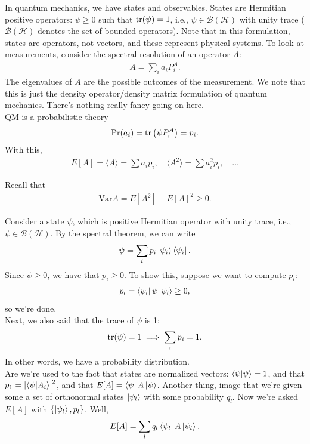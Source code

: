 \documentclass{book}
\theoremstyle{definition}
\newcommand{\had}{\mathcal{H}}
\newcommand{\lp}{\left(}
\newcommand{\rp}{\right)}
\begin{document}
In quantum mechanics, we have states and observables. States are Hermitian positive operators: $\psi \geq 0$ such that $\tr(\psi) = 1$, i.e., $\psi \in \mathcal{B}(\had)$ with unity trace ($\mathcal{B}(\had)$ denotes the set of bounded operators). Note that in this formulation, states are operators, not vectors, and these represent physical systems. To look at measurements, consider the spectral resolution of an operator $A$:
\begin{align}
A = \sum_i a_i P_i^A.
\end{align}
The eigenvalues of $A$ are the possible outcomes of the measurement. We note that this is just the density operator/density matrix formulation of quantum mechanics. There's nothing really fancy going on here.\\

QM is a probabilistic theory
\begin{align}
	\Pr(a_i) = \tr\lp \psi P_i^A \rp= p_i.
\end{align}
With this,
\begin{align}
E[A] = \langle A \rangle = \sum a_i p_i, \quad \langle A^2 \rangle = \sum a_i^2 p_i, \quad \dots
\end{align}

Recall that 
\begin{align}
\text{Var}{A} = E[A^2] - E[A]^2\geq 0.
\end{align}

Consider a state $\psi$, which is positive Hermitian operator with unity trace, i.e., $\psi \in \mathcal{B}(\had)$. By the spectral theorem, we can write
\begin{align}
{\psi} = \sum_i p_i \ket{\psi_i}\bra{\psi_i}.
\end{align}
Since $\psi \geq 0$, we have that $p_i \geq 0$. To show this, suppose we want to compute $p_l$:
\begin{align}
p_l= \bra{\psi_l}\psi \ket{\psi_l} \geq 0,
\end{align}
so we're done. \\


Next, we also said that the trace of $\psi$ is 1: 
\begin{align}
\tr(\psi) = 1 \implies \sum_i p_i = 1. 
\end{align}
In other words, we have a probability distribution.\\

Are we're used to the fact that states are normalized vectors: $\braket{\psi} = 1$, and that $p_1 = \abs{\bra{\psi}\ket{A_i}}^2$, and that $E[A] = \bra{\psi }A \ket{\psi}$. Another thing, image that we're given some a set of orthonormal states $\ket{\psi_l}$ with some probability $q_l$. Now we're asked $E[A]$ with $\{ \ket{\psi_l}, p_l  \}$. Well,
\begin{align}
E[A] = \sum_l  q_l \bra{\psi_l} A \ket{\psi_l}.
\end{align}
\end{document}
